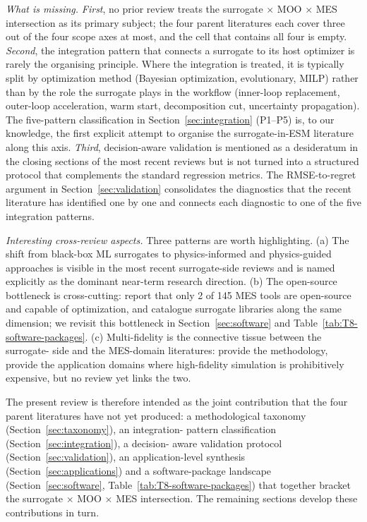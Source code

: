 \emph{What is missing.}
\emph{First}, no prior review treats the surrogate $\times$ MOO
$\times$ MES intersection as its primary subject; the four parent
literatures each cover three out of the four scope axes at most,
and the cell that contains all four is empty. \emph{Second}, the
integration pattern that connects a surrogate to its host optimizer
is rarely the organising principle. Where the integration is
treated, it is typically split by optimization method (Bayesian
optimization, evolutionary, MILP) rather than by the role the
surrogate plays in the workflow (inner-loop replacement, outer-loop
acceleration, warm start, decomposition cut, uncertainty
propagation). The five-pattern classification in
Section~\ref{sec:integration} (P1--P5) is, to our knowledge, the
first explicit attempt to organise the surrogate-in-ESM literature
along this axis. \emph{Third}, decision-aware validation is
mentioned as a desideratum in the closing sections of the most
recent reviews
\cite{Khaloie2025,Lim2025,Starke2025214,Ruan2021221,Tan2026}
but is not turned into a structured protocol that complements the
standard regression metrics. The RMSE-to-regret argument in
Section~\ref{sec:validation} consolidates the diagnostics that the
recent literature has identified one by one and connects each
diagnostic to one of the five integration patterns.

\emph{Interesting cross-review aspects.}
Three patterns are worth highlighting. (a) The shift from black-box
ML surrogates to physics-informed and physics-guided approaches is
visible in the most recent surrogate-side reviews
\cite{Mohammadi2024,Tan2026,Khan2024_DT,Li2025_hydrogen} and is
named explicitly as the dominant near-term research direction. (b)
The open-source bottleneck is cross-cutting: \cite{Klemm2021} report
that only 2 of 145 MES tools are open-source and capable of
optimization, and \cite{Bhosekar2018} catalogue surrogate libraries
along the same dimension; we revisit this bottleneck in
Section~\ref{sec:software} and Table~\ref{tab:T8-software-packages}.
(c) Multi-fidelity is the connective tissue between the surrogate-
side and the MES-domain literatures: \cite{FernandezGodino2023}
provide the methodology, \cite{Klemm2021,Manco2024,Fattahi2020}
provide the application domains where high-fidelity simulation is
prohibitively expensive, but no review yet links the two.

The present review is therefore intended as the joint contribution
that the four parent literatures have not yet produced: a
methodological taxonomy (Section~\ref{sec:taxonomy}), an integration-
pattern classification (Section~\ref{sec:integration}), a decision-
aware validation protocol (Section~\ref{sec:validation}), an
application-level synthesis (Section~\ref{sec:applications}) and a
software-package landscape (Section~\ref{sec:software},
Table~\ref{tab:T8-software-packages}) that together bracket the
surrogate $\times$ MOO $\times$ MES intersection. The remaining
sections develop these contributions in turn.

